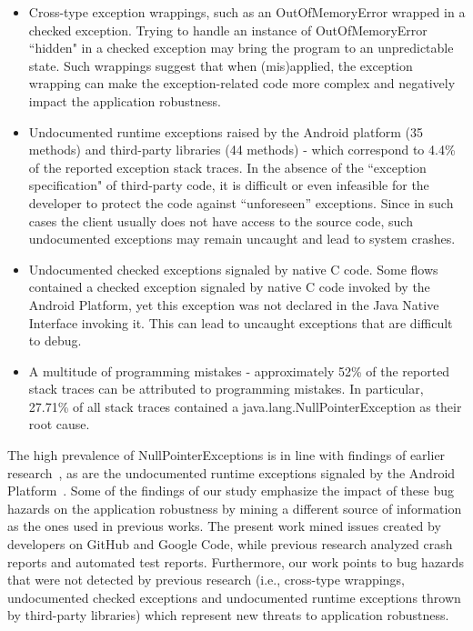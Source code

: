 \begin{itemize}

   \item  Cross-type exception wrappings, such as an OutOfMemoryError wrapped in a checked exception.
Trying to handle an instance of OutOfMemoryError ``hidden" in  a checked exception may bring the program
 to an unpredictable state. Such wrappings suggest that when (mis)applied, the exception wrapping can make 
the exception-related code more complex and negatively impact the application robustness.

  \item  Undocumented runtime exceptions raised by the Android platform (35 methods) and  third-party libraries (44 methods) -
 which correspond to 4.4\% of the reported exception stack traces.
In the absence of the ``exception specification" of third-party code, it is difficult or 
even infeasible for the developer to protect the code against ``unforeseen'' exceptions. 
Since in such cases the client usually does not have access to the source code, such undocumented 
exceptions may remain uncaught and lead to system crashes. 

   \item Undocumented checked exceptions signaled by native C code.  Some flows contained a checked 
exception signaled by native C code invoked by the Android Platform, yet this exception was not declared
 in the Java Native Interface invoking it. This can lead to uncaught exceptions that are 
difficult to debug. 

 \item A multitude of programming mistakes - approximately 52\% of the reported stack traces can 
be attributed to programming mistakes. In particular, 27.71\% of all stack traces contained a java.lang.NullPointerException 
as their root cause.

\end{itemize}

 The high prevalence of NullPointerExceptions is in line with findings of earlier research~\cite{kim2013predicting,fraser20131600,csallner2004jcrasher}, as are the undocumented runtime 
exceptions signaled by the Android Platform~\cite{kechagia2014}. 
Some of the findings of our
 study emphasize the impact of these bug hazards on the application robustness 
by mining a different source of information as the ones used in previous works. The present work 
mined issues created by developers on GitHub and Google Code, while  previous research analyzed crash reports and automated test reports.
 Furthermore, our work points to bug hazards that were not detected by previous research (i.e., cross-type wrappings, undocumented checked exceptions and undocumented runtime exceptions thrown by third-party libraries) which represent new threats to application robustness.

